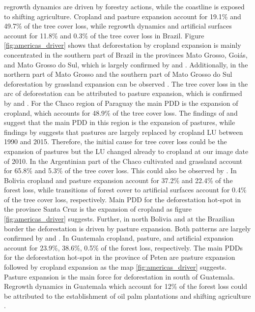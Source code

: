 regrowth dynamics are driven by forestry actions, while the coastline is exposed to shifting agriculture. Cropland and pasture expansion account for 19.1\% and 49.7\% of the tree cover loss, while regrowth dynamics and artificial surfaces account for 11.8\% and 0.3\% of the tree cover loss in Brazil. Figure \ref{fig:americas_driver} shows that deforestation by cropland expansion is mainly concentrated in the southern part of Brazil in the provinces Mato Grosso, Goi\'{a}s, and Mato Grosso do Sul, which is largely confirmed by \citet{Zalles2018} and \citet{Graesser2015}. Additionally, in the northern part of Mato Grosso and the southern part of Mato Grosso do Sul deforestation by grassland expansion can be observed \citep{Graesser2015,Sy2015}. The tree cover loss in the arc of deforestation can be attributed to pasture expansion, which is confirmed by \citet{Sy2015} and \citet{Graesser2015}. For the Chaco region of Paraguay the main \ac{PDD} is the expansion of cropland, which accounts for 48.9\% of the tree cover loss. The findings of \citet{Graesser2015} and \citet{Caldas2013} suggest that the main \ac{PDD} in this region is the expansion of pastures, while findings by \citet{Graesser2018} suggests that pastures are largely replaced by cropland \ac{LU} between 1990 and 2015. Therefore, the initial cause for tree cover loss could be the expansion of pastures but the \ac{LU} changed already to cropland at our image date of 2010. In the Argentinian part of the Chaco cultivated and grassland account for 65.8\% and 5.3\% of the tree cover loss. This could also be observed by \citet{Sy2015}. In Bolivia cropland and pasture expansion account for 37.2\% and 22.4\% of the forest loss, while transitions of forest cover to artificial surfaces account for 0.4\% of the tree cover loss, respectively. Main \ac{PDD} for the deforestation hot-spot in the province Santa Cruz is the expansion of cropland as figure \ref{fig:americas_driver} suggests. Further, in north Bolivia and at the Brazilian border the deforestation is driven by pasture expansion. Both patterns are largely confirmed by \citet{Graesser2015} and \citet{Sy2015}. In Guatemala cropland, pasture, and artificial expansion account for 23.9\%, 38.6\%, 0.5\% of the forest loss, respectively. The main \acp{PDD} for the deforestation hot-spot in the province of Peten are pasture expansion followed by cropland expansion as the map \ref{fig:americas_driver} suggests. Pasture expansion is the main force for deforestation in south of Guatemala. Regrowth dynamics in Guatemala which account for 12\% of the forest loss could be attributed to the establishment of oil palm plantations and shifting agriculture \citep{Furumo2017,Curtis2018}.
